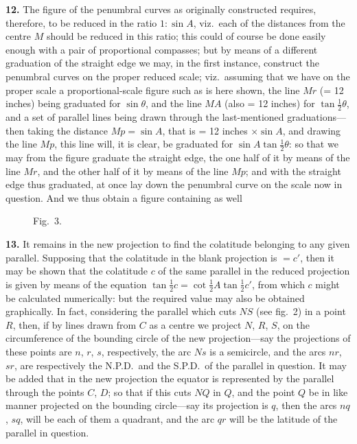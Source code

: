 \documentclass[11pt,a4paper]{article}
\begin{document}
\noindent\textbf{12.} The figure of the penumbral curves as originally constructed requires, therefore, to be reduced in the ratio $1 : \sin A$, viz.\ each of the distances from the centre $M$ should be reduced in this ratio; this could of course be done easily enough with a pair of proportional compasses; but by means of a different graduation of the straight edge we may, in the first instance, construct the penumbral curves on the proper reduced scale; viz.\ assuming that we have on the proper scale a proportional-scale figure such as is here shown, the line $Mr$ (= 12 inches) being graduated for $\sin \theta$, and the line $MA$ (also = 12 inches) for $\tan \tfrac{1}{2}\theta$, and a set of parallel lines being drawn through the last-mentioned graduations---then taking the distance $Mp = \sin A$, that is = 12 inches $\times \sin A$, and drawing the line $Mp$, this line will, it is clear, be graduated for $\sin A \tan \tfrac{1}{2}\theta$: so that we may from the figure graduate the straight edge, the one half of it by means of the line $Mr$, and the other half of it by means of the line $Mp$; and with the straight edge thus graduated, at once lay down the penumbral curve on the scale now in question. And we thus obtain a figure containing as well %

\begin{figure}[H]
\centering
\caption*{Fig.~3.}
\end{figure}

\noindent\textbf{13.} It remains in the new projection to find the colatitude belonging to any given parallel. Supposing that the colatitude in the blank projection is $= c'$, then it may be shown that the colatitude $c$ of the same parallel in the reduced projection is given by means of the equation $\tan \tfrac{1}{2}c = \cot \tfrac{1}{2}A \tan \tfrac{1}{2}c'$, from which $c$ might be calculated numerically: but the required value may also be obtained graphically. In fact, considering the parallel which cuts $NS$ (see fig.~2) in a point $R$, then, if by lines drawn from $C$ as a centre we project $N$, $R$, $S$, on the circumference of the bounding circle of the new projection---say the projections of these points are $n$, $r$, $s$, respectively, the arc $Ns$ is a semicircle, and the arcs $nr$, $sr$, are respectively the N.P.D.\ and the S.P.D.\ of the parallel in question. It may be added that in the new projection the equator is represented by the parallel through the points $C$, $D$; so that if this cuts $NQ$ in $Q$, and the point $Q$ be in like manner projected on the bounding circle---say its projection is $q$, then the arcs $nq$, $sq$, will be each of them a quadrant, and the arc $qr$ will be the latitude of the parallel in question.
\end{document}
